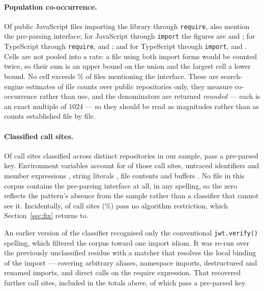 \documentclass[pdflatex,sn-basic,twocolumn]{sn-jnl}%
\begin{document}
\paragraph{Population co-occurrence.} Of \PopJsRequireFiles{} public JavaScript
files importing the library through \texttt{require},
\PopJsRequireFilesWithApi{} also mention the pre-parsing interface; for
JavaScript through \texttt{import} the figures are \PopJsImportFiles{} and
\PopJsImportFilesWithApi; for TypeScript through \texttt{require},
\PopTsRequireFiles{} and \PopTsRequireFilesWithApi; and for TypeScript through
\texttt{import}, \PopTsImportFiles{} and \PopTsImportFilesWithApi. Cells are not
pooled into a rate: a file using both import forms would be counted twice, so
their sum \PopSumFiles{} is an upper bound on the union and the largest cell
\PopLargestCellFiles{} a lower bound. No cell exceeds \PopWorstCellPct\% of files
mentioning the interface. These are search-engine estimates of file counts over
public repositories only, they measure co-occurrence rather than use, and the
denominators are returned \emph{rounded} --- each is an exact multiple of $1024$
--- so they should be read as magnitudes rather than as counts established file
by file.

\paragraph{Classified call sites.} Of \SampleCallSites{} call sites classified
across \SampleRepos{} distinct repositories in our sample,
\SampleSitesPreparsed{} pass a pre-parsed key. Environment variables account for
\SampleEnvString{} of those call sites, untraced identifiers and member
expressions \SampleUnknown{}, string literals \SampleStringLiteral{}, file
contents \SampleFileContents{} and buffers \SampleBuffer. No file in this corpus
contains the pre-parsing interface at all, in any spelling, so the zero reflects
the pattern's absence from the sample rather than a classifier that cannot see
it. Incidentally, \SampleNoAlgorithms{} of \SampleCallSites{} call sites
(\SampleNoAlgorithmsPct\%) pass no algorithm restriction, which
Section~\ref{sec:fix} returns to.

An earlier version of the classifier recognised only the conventional
\texttt{jwt.verify()} spelling, which filtered the corpus toward one import
idiom. It was re-run over the previously unclassified residue with a matcher that
resolves the local binding of the import --- covering arbitrary aliases,
namespace imports, destructured and renamed imports, and direct calls on the
require expression. That recovered \SampleRematchAdded{} further call sites,
included in the totals above, of which \RematchSitesPreparsed{} pass a pre-parsed
key.
\end{document}
